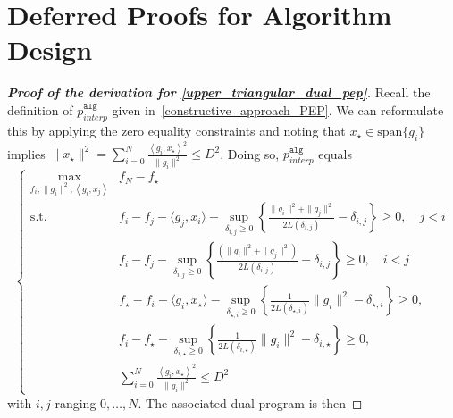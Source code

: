 \documentclass[11pt, hidelinks]{article}
\numberwithin{equation}{section}
\theoremstyle{thmstyletwo}%
\numberwithin{equation}{section}
\newcommand{\inner}[2]{\left\langle {#1}, {#2} \right\rangle}
\newcommand{\pAlg}{p^\mathtt{alg}}
\begin{document}
   


\section{Deferred Proofs for Algorithm Design}\label{sec: appendix algo design}

\begin{proof}[\bf Proof of the derivation for \eqref{upper_triangular_dual_pep}]
Recall the definition of $\pAlg_{interp}$ given in~\eqref{constructive_approach_PEP}. We can reformulate this by applying the zero equality constraints and noting that $x_\star \in \mathrm{span}\{g_i\}$ implies $\|x_\star\|^2 = \sum_{i=0}^N \frac{\inner{g_i}{x_\star}^2}{\|g_i\|^2} \leq D^2$. Doing so, $\pAlg_{interp}$ equals
\begin{equation}\label{simplified_PEP_delta}
\begin{cases}
    \displaystyle\max_{f_i, \|g_i\|^2, \inner{g_i}{x_j}} & f_N - f_\star \\
    \mathrm{s.t.} & f_i - f_j - \langle g_j, x_i \rangle - \sup_{\delta_{i,j} \geq 0}\left\{\frac{\|g_i\|^2 + \|g_j\|^2}{2L(\delta_{i,j})} - \delta_{i,j}\right\} \geq 0, \quad j < i \\
    & f_i - f_j - \sup_{\delta_{i,j} \geq 0}\left\{\frac{\left(\|g_i\|^2 + \|g_j\|^2\right)}{2L(\delta_{i,j})} - \delta_{i,j}\right\} \geq 0, \quad i < j  \\
    & f_\star - f_i - \langle g_i, x_\star \rangle - \sup_{\delta_{\star, i} \geq 0}\left\{\frac{1}{2L(\delta_{\star,i})}\|g_i\|^2 - \delta_{\star,i}\right\} \geq 0, \\
    & f_i - f_\star - \sup_{\delta_{i,\star} \geq 0}\left\{\frac{1}{2L(\delta_{i,\star})}\|g_i\|^2 - \delta_{i, \star}\right\} \geq 0, \\
    & \sum_{i=0}^N \frac{\inner{g_i}{x_\star}^2}{\|g_i\|^2} \leq D^2
\end{cases}
\end{equation}
with $i, j$ ranging $0, \dots, N$.
The associated dual program is then


\end{proof}
\end{document}
